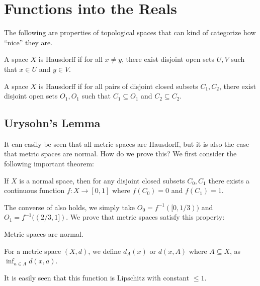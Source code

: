 \section{Functions into the Reals}

The following are properties of topological spaces that can kind of categorize how ``nice'' they are.

\begin{definition}[Hausdorff ($T_2$)]
    A space $X$ is Hausdorff if for all $x \ne y$, there exist disjoint open sets $U, V$ such that $x \in U$ and $y \in V$.
\end{definition}

\begin{definition}[Normal ($T_4$)]
    A space $X$ is Hausdorff if for all pairs of disjoint closed subsets $C_1, C_2$, there exist disjoint open sets $O_1, O_1$ such that $C_1 \subseteq O_1$ and $C_2 \subseteq C_2$.
\end{definition}

\subsection{Urysohn's Lemma}

It can easily be seen that all metric spaces are Hausdorff, but it is also the case that metric spaces are normal. How do we prove this? We first consider the following important theorem:

\begin{theorem}
    \label{thm:urysohnlemma}
    If $X$ is a normal space, then for any disjoint closed subsets $C_0, C_1$ there exists a continuous function $f\colon X \to [0, 1]$ where $f(C_0) = 0$ and $f(C_1) = 1$.
\end{theorem}

The converse of  also holds, we simply take $O_0 = f^{-1}([0, 1/3))$ and $O_1 = f^{-1}((2/3, 1])$. We prove that metric spaces satisfy this property:

\begin{proposition}
    \label{prop:metricnormal}
    Metric spaces are normal.
\end{proposition}

\begin{definition}
    For a metric space $(X, d)$, we define $d_A(x)$ or $d(x, A)$ where $A \subseteq X$, as $\inf_{a \in A} d(x, a)$.
\end{definition}

It is easily seen that this function is Lipschitz with constant $\le 1$.

